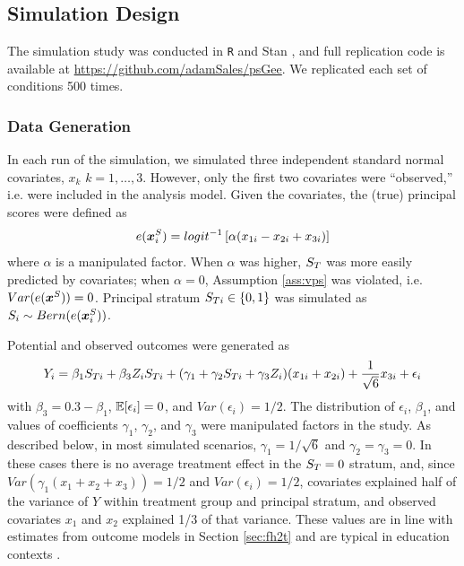 \documentclass[]{article}
\begin{document}
\subsection{Simulation Design}
The simulation study was conducted in \texttt{R} \citep{rcite} and Stan \citep{rstan}, and full replication code is available at %
\url{https://github.com/adamSales/psGee}.
We replicated each set of conditions 500 times.

\subsubsection{Data Generation}

In each run of the simulation, we simulated three independent standard normal covariates, $x_k$ $k=1,\dots,3$. However, only the first two covariates were ``observed,'' i.e. were included in the analysis model.
Given the covariates, the (true) principal scores were defined as
\begin{equation*}
  e(\bm{x}^S_i)=logit^{-1}\left[\alpha(x_{1i}-x_{2i}+x_{3i})\right]
\end{equation*}
where $\alpha$ is a manipulated factor.
When $\alpha$ was higher, $S_T$ was more easily predicted by covariates; when $\alpha=0$, Assumption \ref{ass:vps} was violated, i.e. $Var(e(\bm{x}^S))=0$.
Principal stratum $S_{Ti}\in \{0,1\}$ was simulated as $S_i\sim Bern(e(\bm{x}^S_i))$.

Potential and observed outcomes were generated as
\begin{equation}\label{eq:y-sim}
Y_i=\beta_1\sti+\beta_3Z_i\sti+(\gamma_1+\gamma_2\sti+\gamma_3Z_i)(x_{1i}+x_{2i})+\frac{1}{\sqrt{6}}x_{3i}+\epsilon_i%
\end{equation}
with $\beta_3=0.3-\beta_1$, $\mathbb{E}[\epsilon_i]=0$, and $Var(\epsilon_i)=1/2$.
The distribution of $\epsilon_i$, $\beta_1$, and values of coefficients $\gamma_1$, $\gamma_2$, and $\gamma_3$ were manipulated factors in the study.
As described below, in most simulated scenarios, $\gamma_1=1/\sqrt{6}$ and $\gamma_2=\gamma_3=0$. In these cases there is no average treatment effect in the $S_T=0$ stratum, and, since  $Var(\gamma_1(x_1+x_2+x_3))=1/2$ and $Var(\epsilon_i)=1/2$, covariates explained half of the variance of $Y$ within treatment group and principal stratum, and observed covariates $x_1$ and $x_2$ explained 1/3 of that variance.
These values are in line with estimates from outcome models in Section \ref{sec:fh2t} and are typical in education contexts \cite{hedgesHedberg}.
\end{document}
